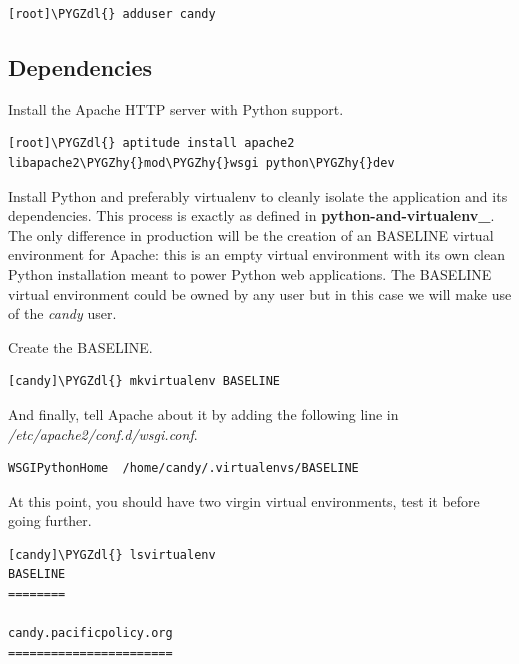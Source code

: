 \documentclass[letterpaper,10pt,english]{sphinxmanual}
\def\PYGZdl{\char`\$}
\def\PYGZhy{\char`\-}
\begin{document}
\begin{Verbatim}[commandchars=\\\{\}]
[root]\PYGZdl{} adduser candy
\end{Verbatim}


\subsection{Dependencies}
\label{administrator-guide:dependencies}
Install the Apache HTTP server with Python support.

\begin{Verbatim}[commandchars=\\\{\}]
[root]\PYGZdl{} aptitude install apache2 libapache2\PYGZhy{}mod\PYGZhy{}wsgi python\PYGZhy{}dev
\end{Verbatim}

Install Python and preferably virtualenv to cleanly isolate the
application and its dependencies. This process is exactly as defined
in {\color{red}\bfseries{}python-and-virtualenv\_}. The only difference in production
will be the creation of an BASELINE virtual environment for Apache:
this is an empty virtual environment with its own clean Python
installation meant to power Python web applications. The BASELINE
virtual environment could be owned by any user but in this case we
will make use of the \emph{candy} user.

Create the BASELINE.

\begin{Verbatim}[commandchars=\\\{\}]
[candy]\PYGZdl{} mkvirtualenv BASELINE
\end{Verbatim}

And finally, tell Apache about it by adding the following line in
\emph{/etc/apache2/conf.d/wsgi.conf}.

\begin{Verbatim}[commandchars=\\\{\}]
WSGIPythonHome  /home/candy/.virtualenvs/BASELINE
\end{Verbatim}

At this point, you should have two virgin virtual environments, test
it before going further.

\begin{Verbatim}[commandchars=\\\{\}]
[candy]\PYGZdl{} lsvirtualenv
BASELINE
========

candy.pacificpolicy.org
=======================
\end{Verbatim}
\end{document}
